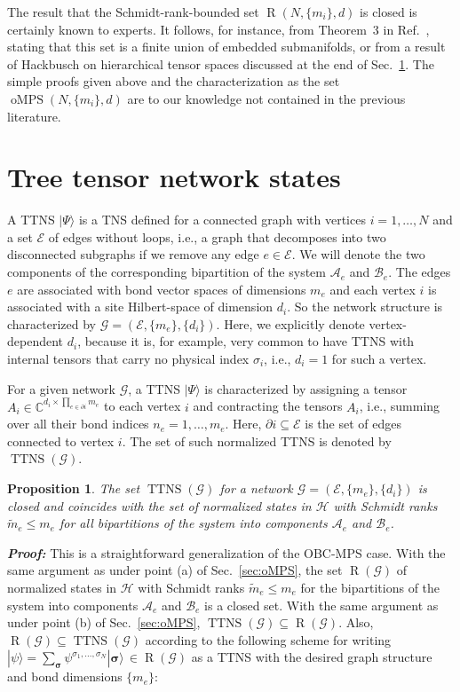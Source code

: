 \documentclass[english,11pt,aps,pra,onecolumn,tightenlines,groupedaddress,superscriptaddress,notitlepage,floatfix,fleqn]{revtex4-1}
\newcommand{\ket}{\rangle}
\renewcommand{\vec}[1]{{\boldsymbol{#1}}}
\newcommand{\s}{\sigma}
\newcommand{\vs}{\vec{\sigma}}
\newcommand{\CC}{\mathbb{C}}
\newcommand{\mc}[1]{\mathcal{#1}}
\renewcommand{\H}{\mc{H}}
\newcommand{\A}{\mc{A}}
\newcommand{\B}{\mc{B}}
\newcommand{\E}{\mc{E}}
\newcommand{\G}{\mc{G}}
\newcommand{\oMPS}{\operatorname{oMPS}}
\newcommand{\TTNS}{\operatorname{TTNS}}
\newcommand{\R}{\operatorname{R}}
\newcommand{\Emph}[1]{\textbf{\emph{#1}}}
\newtheorem{prop}{Proposition}
\begin{document}
The result that the Schmidt-rank-bounded set $\R(N,\{m_i\},d)$ is closed is certainly known to experts. It follows, for instance, from Theorem~3 in Ref.~\cite{Holtz2012-120}, stating that this set is a finite union of embedded submanifolds, or from a result of Hackbusch on hierarchical tensor spaces discussed at the end of Sec.~\ref{sec:TTNS}. The simple proofs given above and the characterization as the set $\oMPS(N,\{m_i\},d)$ are to our knowledge not contained in the previous literature.


\section{Tree tensor network states}\label{sec:TTNS}
A TTNS $|\Psi\ket$ is a TNS defined for a connected graph with vertices $i=1,\dots,N$ and a set $\E$ of edges without loops, i.e., a graph that decomposes into two disconnected subgraphs if we remove any edge $e\in\E$. We will denote the two components of the corresponding bipartition of the system $\A_e$ and $\B_e$. The edges $e$ are associated with bond vector spaces of dimensions $m_e$ and each vertex $i$ is associated with a site Hilbert-space of dimension $d_i$. So the network structure is characterized by $\G=(\E,\{m_e\},\{d_i\})$.
Here, we explicitly denote vertex-dependent $d_i$, because it is, for example, very common to have TTNS with internal tensors that carry no physical index $\sigma_i$, i.e., $d_i=1$ for such a vertex.

For a given network $\G$, a TTNS $|\Psi\ket$ is characterized by assigning a tensor $A_i\in\CC^{d_i\times \prod_{e\in\partial i}m_e}$ to each vertex $i$ and contracting the tensors $A_i$, i.e., summing over all their bond indices $n_e=1,\dots,m_e$. Here, $\partial i\subseteq\E$ is the set of edges connected to vertex $i$. The set of such normalized TTNS is denoted by $\TTNS(\G)$.

\begin{prop}\label{prop:TTNS}
The set $\TTNS(\G)$ for a network $\G=(\E,\{m_e\},\{d_i\})$ is closed and coincides with the set of normalized states in $\H$ with Schmidt ranks $\tilde{m}_e\leq m_e$ for all bipartitions of the system into components $\A_e$ and $\B_e$.
\end{prop}
\Emph{Proof:} This is a straightforward generalization of the OBC-MPS case. With the same argument as under point (a) of Sec.~\ref{sec:oMPS}, the set $\R(\G)$ of normalized states in $\H$ with Schmidt ranks $\tilde{m}_e\leq m_e$ for the bipartitions of the system into components $\A_e$ and $\B_e$ is a closed set. With the same argument as under point (b) of Sec.~\ref{sec:oMPS}, $\TTNS(\G)\subseteq \R(\G)$. Also, $\R(\G)\subseteq \TTNS(\G)$ according to the following scheme for writing $|\psi\ket=\sum_\vs \psi^{\s_1,\dotsc,\s_N}|\vs\ket\,\in\R(\G)$ as a TTNS with the desired graph structure and bond dimensions $\{m_e\}$:
\end{document}
